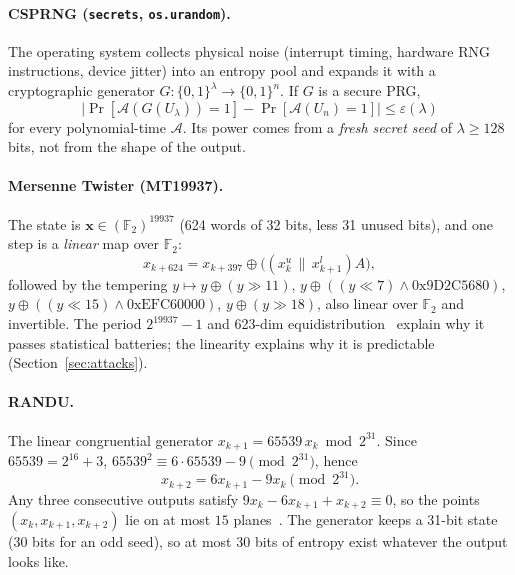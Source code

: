 \documentclass[11pt,a4paper]{article}
\theoremstyle{plain}
\theoremstyle{definition}
\begin{document}
\paragraph{CSPRNG (\texttt{secrets}, \texttt{os.urandom}).}
The operating system collects physical noise (interrupt timing, hardware RNG
instructions, device jitter) into an entropy pool and expands it with a
cryptographic generator $G:\{0,1\}^\lambda\to\{0,1\}^n$. If $G$ is a secure PRG,
\begin{equation}
    \big|\Pr[\mathcal{A}(G(U_\lambda))=1]-\Pr[\mathcal{A}(U_n)=1]\big|\le\varepsilon(\lambda)
\end{equation}
for every polynomial-time $\mathcal{A}$. Its power comes from a \emph{fresh
secret seed} of $\lambda\ge 128$ bits, not from the shape of the output.

\paragraph{Mersenne Twister (MT19937).}
The state is $\mathbf{x}\in(\mathbb{F}_2)^{19937}$ (624 words of 32 bits, less
31 unused bits), and one step is a \emph{linear} map over $\mathbb{F}_2$:
\begin{equation}
    x_{k+624}=x_{k+397}\oplus\big((x_k^{u}\,\|\,x_{k+1}^{l})A\big),
\end{equation}
followed by the tempering $y\mapsto y\oplus(y\!\gg\!11)$,
$y\oplus((y\!\ll\!7)\wedge\mathrm{0x9D2C5680})$,
$y\oplus((y\!\ll\!15)\wedge\mathrm{0xEFC60000})$, $y\oplus(y\!\gg\!18)$, also
linear over $\mathbb{F}_2$ and invertible. The period $2^{19937}-1$ and 623-dim
equidistribution~\cite{mt98} explain why it passes statistical batteries; the
linearity explains why it is predictable (Section~\ref{sec:attacks}).

\paragraph{RANDU.} The linear congruential generator
$x_{k+1}=65539\,x_k \bmod 2^{31}$. Since $65539=2^{16}+3$,
$65539^2\equiv 6\cdot65539-9 \pmod{2^{31}}$, hence
\begin{equation}
    x_{k+2}=6x_{k+1}-9x_k \pmod{2^{31}}.
\end{equation}
Any three consecutive outputs satisfy $9x_k-6x_{k+1}+x_{k+2}\equiv0$, so the
points $(x_k,x_{k+1},x_{k+2})$ lie on at most $15$ planes~\cite{marsaglia68}. The
generator keeps a 31-bit state (30 bits for an odd seed), so at most $30$ bits
of entropy exist whatever the output looks like.
\end{document}
